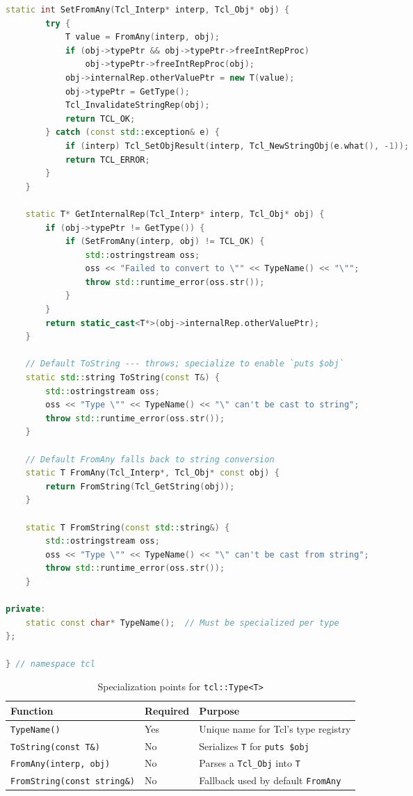 \begin{lstlisting}[language=C++, caption={\texttt{tcl/type.h} --- type registration template}]
    static int SetFromAny(Tcl_Interp* interp, Tcl_Obj* obj) {
        try {
            T value = FromAny(interp, obj);
            if (obj->typePtr && obj->typePtr->freeIntRepProc)
                obj->typePtr->freeIntRepProc(obj);
            obj->internalRep.otherValuePtr = new T(value);
            obj->typePtr = GetType();
            Tcl_InvalidateStringRep(obj);
            return TCL_OK;
        } catch (const std::exception& e) {
            if (interp) Tcl_SetObjResult(interp, Tcl_NewStringObj(e.what(), -1));
            return TCL_ERROR;
        }
    }

    static T* GetInternalRep(Tcl_Interp* interp, Tcl_Obj* obj) {
        if (obj->typePtr != GetType()) {
            if (SetFromAny(interp, obj) != TCL_OK) {
                std::ostringstream oss;
                oss << "Failed to convert to \"" << TypeName() << "\"";
                throw std::runtime_error(oss.str());
            }
        }
        return static_cast<T*>(obj->internalRep.otherValuePtr);
    }

    // Default ToString --- throws; specialize to enable `puts $obj`
    static std::string ToString(const T&) {
        std::ostringstream oss;
        oss << "Type \"" << TypeName() << "\" can't be cast to string";
        throw std::runtime_error(oss.str());
    }

    // Default FromAny falls back to string conversion
    static T FromAny(Tcl_Interp*, Tcl_Obj* const obj) {
        return FromString(Tcl_GetString(obj));
    }

    static T FromString(const std::string&) {
        std::ostringstream oss;
        oss << "Type \"" << TypeName() << "\" can't be cast from string";
        throw std::runtime_error(oss.str());
    }

private:
    static const char* TypeName();  // Must be specialized per type
};

} // namespace tcl
\end{lstlisting}

\begin{table}[H]
\centering
\caption{Specialization points for \texttt{tcl::Type<T>}}
\begin{tabular}{lll}
\toprule
\textbf{Function} & \textbf{Required} & \textbf{Purpose} \\
\midrule
\texttt{TypeName()} & Yes & Unique name for Tcl's type registry \\
\texttt{ToString(const T\&)} & No & Serializes \texttt{T} for \texttt{puts \$obj} \\
\texttt{FromAny(interp, obj)} & No & Parses a \texttt{Tcl\_Obj} into \texttt{T} \\
\texttt{FromString(const string\&)} & No & Fallback used by default \texttt{FromAny} \\
\bottomrule
\end{tabular}
\end{table}

